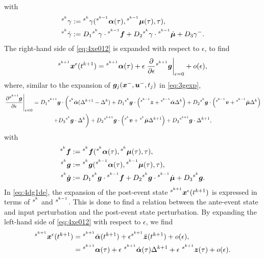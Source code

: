\documentclass[../DC2019003Bouma.tex]{subfiles}
\begin{document}
with
\begin{align*}
\hspace{0cm}^{s^k}\gamma &:= \hspace{0cm}^{s^k}\gamma(\hspace{0cm}^{s^{k-1}}\boldsymbol{\alpha}(\tau),\hspace{0cm}^{s^{k-1}}\boldsymbol{\mu}(\tau),\tau),\\
\hspace{0cm}^{s^k}\dot{\gamma} &:= D_1\hspace{0cm}^{s^{k}}\gamma\cdot\hspace{0cm}^{s^{k-1}}{\boldsymbol{f}} + D_2\hspace{0cm}^{s^{k}}\gamma\cdot\hspace{0cm}^{s^{k-1}}\dot{\boldsymbol{\mu}} + D_3\gamma^-.
\end{align*}
The right-hand side of \eqref{eq:4xe012} is expanded with respect to $\epsilon$, to find
\begin{align}
\hspace{0cm}^{s^{k+1}}{\boldsymbol{x}}^\epsilon(t^{k+1}) = \hspace{0cm}^{s^{k+1}}\boldsymbol{\alpha}(\tau) + \epsilon\left.\frac{\partial}{\partial\epsilon}\hspace{0cm}^{s^{k+1}}{\boldsymbol{g}}\right|_{\epsilon=0} + o(\epsilon),\label{eq:4xe012exp}
\end{align}
where, similar to the expansion of ${\boldsymbol{g}}_j({\boldsymbol{x}}^-,{\boldsymbol{u}}^-,t_j)$ in \eqref{eq:3gexp},
\begin{multline}
\left.\frac{\partial\hspace{0cm}^{s^{k+1}}{\boldsymbol{g}}}{\partial\epsilon}\right|_{\epsilon=0} = D_1\hspace{0cm}^{s^{k+1}}{\boldsymbol{g}}\cdot\bigg(\hspace{0cm}^{s^k}\dot{\boldsymbol{\alpha}}(\Delta^{k+1}-\Delta^{k}) + D_1\hspace{0cm}^{s^k}{\boldsymbol{g}}\cdot\left(\hspace{0cm}^{s^{k-1}}{\boldsymbol{z}}+\hspace{0cm}^{s^{k-1}}\dot{\boldsymbol{\alpha}}\Delta^{k}\right) + D_2\hspace{0cm}^{s^k}{\boldsymbol{g}}\cdot\left(\hspace{0cm}^{s^{k-1}}{\boldsymbol{v}}+\hspace{0cm}^{s^{k-1}}\dot{\boldsymbol{\mu}}\Delta^{k}\right) \\ + D_3\hspace{0cm}^{s^k}{\boldsymbol{g}}\cdot\Delta^{k} \bigg)+ D_2 \hspace{0cm}^{s^{k+1}}{\boldsymbol{g}}\cdot\left(\hspace{0cm}^{s^{k}}{\boldsymbol{v}}+\hspace{0cm}^{s^{k}}\dot{\boldsymbol{\mu}}\Delta^{k+1} \right) + D_3\hspace{0cm}^{s^{k+1}}{\boldsymbol{g}}\cdot\Delta^{k+1},\label{eq:4dg1de}
\end{multline}
with
\begin{align*}
\hspace{0cm}^{s^k}{\boldsymbol{f}} &:= \hspace{0cm}^{s^k}{\boldsymbol{f}}(\hspace{0cm}^{s^{k}}\boldsymbol{\alpha}(\tau),\hspace{0cm}^{s^{k}}\boldsymbol{\mu}(\tau),\tau),\\
\hspace{0cm}^{s^k}{\boldsymbol{g}} &:= \hspace{0cm}^{s^k}{\boldsymbol{g}}(\hspace{0cm}^{s^{k-1}}\boldsymbol{\alpha}(\tau),\hspace{0cm}^{s^{k-1}}\boldsymbol{\mu}(\tau),\tau),\\
\hspace{0cm}^{s^k}\dot{{\boldsymbol{g}}} &:= D_1\hspace{0cm}^{s^k}{\boldsymbol{g}}\cdot \hspace{0cm}^{s^{k-1}}{\boldsymbol{f}} + D_2\hspace{0cm}^{s^k}{\boldsymbol{g}}\cdot \hspace{0cm}^{s^{k-1}}\dot{\boldsymbol{\mu}} + D_3\hspace{0cm}^{s^k}{\boldsymbol{g}}.
\end{align*}
In \eqref{eq:4dg1de}, the expansion of the post-event state $\hspace{0cm}^{s^{k+1}}{\boldsymbol{x}}^\epsilon(t^{k+1})$ is expressed in terms of $\hspace{0cm}^{s^{k}}$ and $\hspace{0cm}^{s^{k-1}}$. This is done to find a relation between the ante-event state and input perturbation and the post-event state perturbation. By expanding the left-hand side of \eqref{eq:4xe012} with respect to $\epsilon$, we find
\begin{align}
\ls^{s^{k+1}}\xb^\epsilon(t^{k+1}) &= \ls^{s^{k+1}}\bar{\alphab}(t^{k+1})+\epsilon\ls^{s^{k+1}}\bar{\zb}(t^{k+1}) + o(\epsilon),\\
&= \ls^{s^{k+1}}\alphab(\tau) + \epsilon\ ^{s^{k+1}}\dot{\alphab}(\tau)\Delta^{k+1} + \epsilon\ ^{s^{k+1}}\zb(\tau) + o(\epsilon).\label{eq:4xexp}
\end{align}
\end{document}
